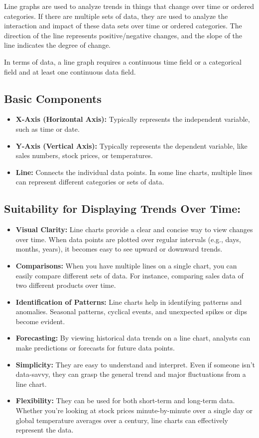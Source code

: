 \documentclass{article}\usepackage[]{graphicx}\usepackage[]{xcolor}
\begin{document}
Line graphs are used to analyze trends in things that change over time or ordered categories. If there are multiple sets of data, they are used to analyze the interaction and impact of these data sets over time or ordered categories. The direction of the line represents positive/negative changes, and the slope of the line indicates the degree of change.

In terms of data, a line graph requires a continuous time field or a categorical field and at least one continuous data field.


\subsection{Basic Components}
\begin{itemize}
  \item \textbf{X-Axis (Horizontal Axis):} Typically represents the independent variable, such as time or date.
  \item \textbf{Y-Axis (Vertical Axis):} Typically represents the dependent variable, like sales numbers, stock prices, or temperatures.
  \item \textbf{Line:} Connects the individual data points. In some line charts, multiple lines can represent different categories or sets of data.
\end{itemize}


\subsection{Suitability for Displaying Trends Over Time:}
\begin{itemize}
    \item \textbf{Visual Clarity:} Line charts provide a clear and concise way to view changes over time. When data points are plotted over regular intervals (e.g., days, months, years), it becomes easy to see upward or downward trends.
    \item \textbf{Comparisons:} When you have multiple lines on a single chart, you can easily compare different sets of data. For instance, comparing sales data of two different products over time.
    \item \textbf{Identification of Patterns:} Line charts help in identifying patterns and anomalies. Seasonal patterns, cyclical events, and unexpected spikes or dips become evident.
    \item \textbf{Forecasting:} By viewing historical data trends on a line chart, analysts can make predictions or forecasts for future data points.
    \item \textbf{Simplicity:} They are easy to understand and interpret. Even if someone isn't data-savvy, they can grasp the general trend and major fluctuations from a line chart.
    \item \textbf{Flexibility:} They can be used for both short-term and long-term data. Whether you're looking at stock prices minute-by-minute over a single day or global temperature averages over a century, line charts can effectively represent the data.
\end{itemize}
\end{document}

